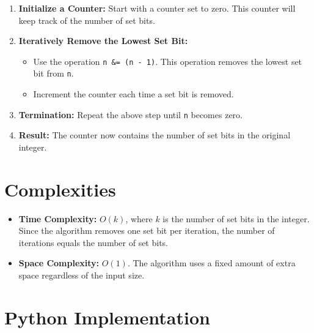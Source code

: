 \begin{enumerate}
    \item \textbf{Initialize a Counter:} Start with a counter set to zero. This counter will keep track of the number of set bits.
    
    \item \textbf{Iteratively Remove the Lowest Set Bit:} 
    \begin{itemize}
        \item Use the operation \texttt{n \&= (n - 1)}. This operation removes the lowest set bit from \texttt{n}.
        \item Increment the counter each time a set bit is removed.
    \end{itemize}
    
    \item \textbf{Termination:} Repeat the above step until \texttt{n} becomes zero.
    
    \item \textbf{Result:} The counter now contains the number of set bits in the original integer.
\end{enumerate}


\section*{Complexities}

\begin{itemize}
    \item \textbf{Time Complexity:} \(O(k)\), where \(k\) is the number of set bits in the integer. Since the algorithm removes one set bit per iteration, the number of iterations equals the number of set bits.
    
    \item \textbf{Space Complexity:} \(O(1)\). The algorithm uses a fixed amount of extra space regardless of the input size.
\end{itemize}

\section*{Python Implementation}


